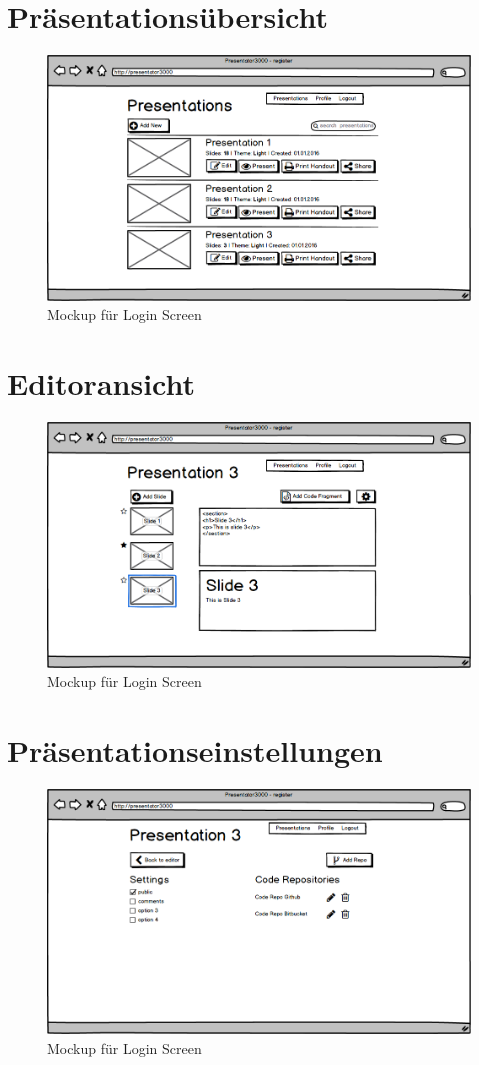 \section{Präsentationsübersicht}
\begin{figure}[H]
	\centering
    \includegraphics[width=1\textwidth]{images/mockup-presentation-overview.png}
    \caption{Mockup für Login Screen}
\end{figure}

\section{Editoransicht}
\begin{figure}[H]
	\centering
    \includegraphics[width=1\textwidth]{images/mockup-presentation-edit.png}
    \caption{Mockup für Login Screen}
\end{figure}

\section{Präsentationseinstellungen}
\begin{figure}[H]
	\centering
    \includegraphics[width=1\textwidth]{images/mockup-presentation-settings-view.png}
    \caption{Mockup für Login Screen}
\end{figure}

